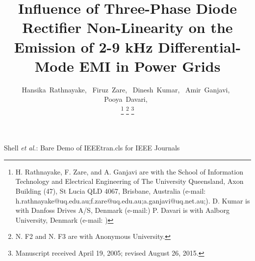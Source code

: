 \documentclass[journal,a4paper,10pt,twoside]{IEEEtran} %
\begin{document}
	
	\title{Influence of Three-Phase Diode Rectifier Non-Linearity on the Emission of 2-9 kHz Differential-Mode EMI in Power Grids}	%
	
	\author{
		Hansika~Rathnayake,~\IEEEmembership{Member,~IEEE,}
		Firuz~Zare,~
		Dinesh~Kumar,~
		Amir~Ganjavi,~
		Pooya~Davari,~
		
		\thanks{
			H. Rathnayake, F. Zare, and A. Ganjavi are with the School of Information Technology and Electrical Engineering of The University Queensland, Axon Building (47), St Lucia QLD 4067, Brisbane, Australia (e-mail: h.rathnayake@uq.edu.au;f.zare@uq.edu.au;a.ganjavi@uq.net.au;). 
			D. Kumar is with  Danfoss Drives A/S, Denmark (e-mail:)
			P. Davari is with Aalborg University, Denmark (e-mail: )
		}
		\thanks{
			N. F2 and N. F3 are with Anonymous University.
		}
		\thanks{
			Manuscript received April 19, 2005; revised August 26, 2015.
		}
	}
	
	{Shell \MakeLowercase{\textit{et al.}}: Bare Demo of IEEEtran.cls for IEEE Journals}
	
	
	
	
	
	\maketitle %
	
\end{document}
